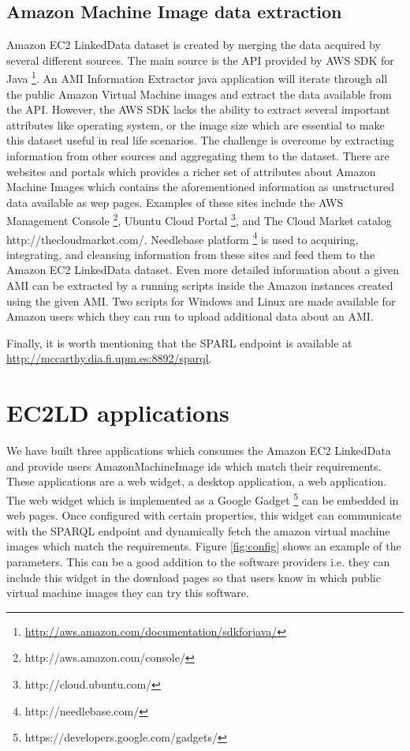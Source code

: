 \subsection{Amazon Machine Image data extraction}
Amazon EC2 LinkedData dataset is created by merging the data acquired by several different sources. The main source is the API provided by AWS SDK for Java \footnote{\url{http://aws.amazon.com/documentation/sdkforjava/}}. An AMI Information Extractor java application will iterate through all the public Amazon Virtual Machine images and extract the data available from the API. However, the AWS SDK lacks the ability to extract several important attributes like operating system, or the image size which are essential to make this dataset useful in real life scenarios. The challenge is overcome by extracting information from other sources and aggregating them to the dataset. There are websites and portals which provides a richer set of attributes about Amazon Machine Images which contains the aforementioned information as unstructured data available as wep pages. Examples of these sites include the AWS Management Console \footnote{http://aws.amazon.com/console/}, Ubuntu Cloud Portal \footnote{http://cloud.ubuntu.com/}, and The Cloud Market catalog {http://thecloudmarket.com/}. Needlebase platform \footnote{http://needlebase.com/} is used to acquiring, integrating, and cleansing information from these sites and feed them to the Amazon EC2 LinkedData dataset. Even more detailed information about a given AMI can be extracted by a running scripts inside the Amazon instances created using the given AMI. Two scripts for Windows and Linux are made available for Amazon users which they can run to upload additional data about an AMI.       

Finally, it is worth mentioning that the SPARL endpoint is available at \url{http://mccarthy.dia.fi.upm.es:8892/sparql}.
\vspace{5mm}
\section{EC2LD applications}\label{sec:apps}
We have built three applications which consumes the Amazon EC2 LinkedData and provide users AmazonMachineImage ids which match their requirements. These applications are a web widget, a desktop application, a web application. The web widget which is implemented as a Google Gadget \footnote{https://developers.google.com/gadgets/} can be embedded in web pages. Once configured with certain properties, this widget can communicate with the SPARQL endpoint and dynamically fetch the amazon virtual machine images which match the requirements. Figure \ref{fig:config} shows an example of the parameters. This can be a good addition to the software providers i.e. they can include this widget in the download pages so that users know in which public virtual machine images they can try this software.

